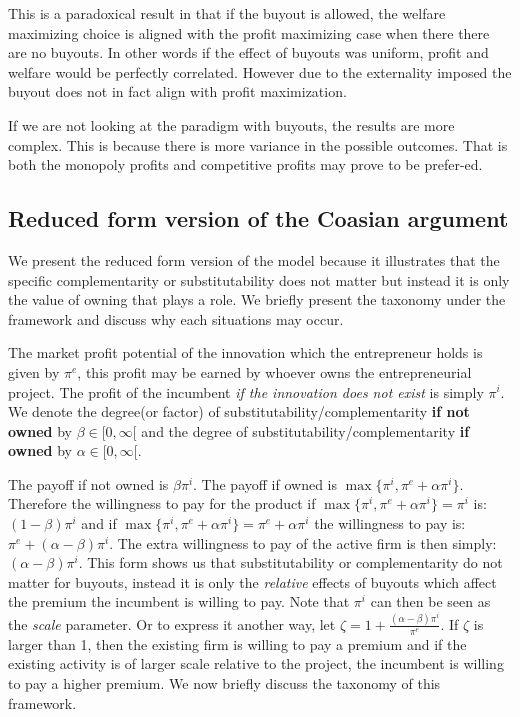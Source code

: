 \documentclass[11pt]{article}
\begin{document}
This is a paradoxical result in that if the buyout is allowed, the welfare maximizing choice is aligned with the profit maximizing case when there there are no buyouts. In other words if the effect of buyouts was uniform, profit and welfare would be perfectly correlated. However due to the externality imposed the buyout does not in fact align with  profit maximization. 

If we are not looking at the paradigm with buyouts, the results are more complex. This is because there is more variance in the possible outcomes. That is both the monopoly profits and competitive profits may prove to be prefer-ed. 

\subsection*{Reduced form version of the Coasian argument}

We present the reduced form version of the model because it illustrates that the specific complementarity or substitutability does not matter but instead it is only the  value of owning that plays a role.  We briefly present the taxonomy under the framework and discuss why each situations may occur. 

The market profit potential of the innovation which the entrepreneur holds is given by $\pi^e$, this profit may be earned by whoever owns the entrepreneurial project. The profit of the incumbent \textit{if the innovation does not exist} is simply $\pi^i$. We denote the degree(or factor) of substitutability/complementarity \textbf{if not owned} by $\beta \in [ 0, \infty [$ and the degree of substitutability/complementarity  \textbf{if owned} by $\alpha \in [0, \infty [ $. 

The payoff if not owned is $ \beta \pi^i$. The payoff if owned is $\max\{ \pi^i, \pi^e + \alpha \pi^i   \}$. Therefore the willingness to pay for the product if  $\max\{ \pi^i, \pi^e + \alpha \pi^i   \} = \pi^i $ is: $(1-\beta) \pi^i$ and if $\max\{ \pi^i, \pi^e + \alpha \pi^i   \} = \pi^e + \alpha \pi^i $ the willingness to pay is: $\pi^e+ (\alpha-\beta) \pi^i$. The extra willingness to pay of the active firm is then simply: $(\alpha-\beta)\pi^i$. This form shows us that substitutability or complementarity do not matter for buyouts, instead it is only the \textit{relative} effects of buyouts which affect the premium the incumbent is willing to pay. Note that $\pi^i$ can then be seen as the \textit{scale} parameter. Or to express it another way, let $\zeta=1 + \frac{(\alpha-\beta)\pi^i}{\pi^e}$. If $\zeta$ is larger than 1, then the existing firm is willing to pay a premium and if the existing activity is of larger scale relative to the project, the incumbent is willing to pay a higher premium. We now briefly discuss the taxonomy of this framework. 
\end{document}
